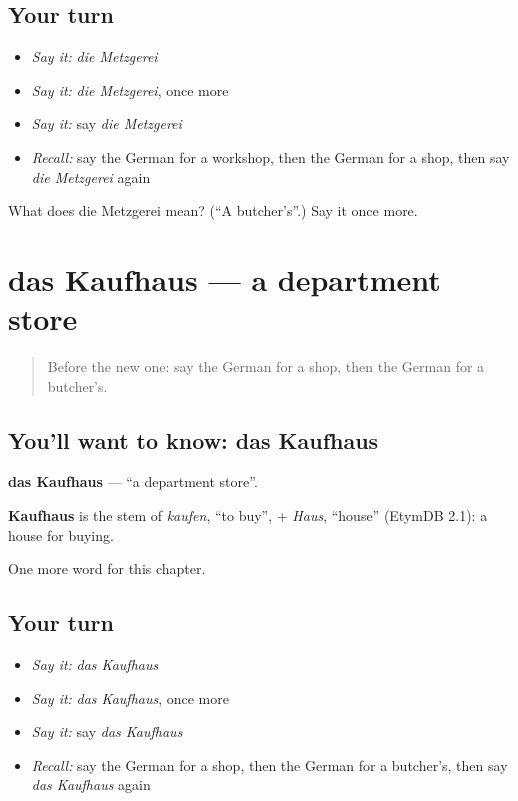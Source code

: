 \subsection*{Your turn}
\begin{itemize}
\raggedright
  \item \emph{Say it:} \emph{die Metzgerei}
  \item \emph{Say it:} \emph{die Metzgerei}, once more
  \item \emph{Say it:} say \emph{die Metzgerei}
  \item \emph{Recall:} say the German for a workshop, then the German for a shop, then say \emph{die Metzgerei} again
\end{itemize}

\begin{tcolorbox}[breakable,colback=teal!4,colframe=teal!35!black,title={Before you move on}]
What does die Metzgerei mean? (\textquotedblleft{}A butcher's\textquotedblright{}.) Say it once more.
\end{tcolorbox}
\section[das Kaufhaus]{das Kaufhaus — a department store}

\label{lesson:GE-C210-kaufhaus}



\begin{quote}
Before the new one: say the German for a shop, then the German for a butcher's.
\end{quote}

\subsection*{You'll want to know: das Kaufhaus}
\textbf{das Kaufhaus} — \textquotedblleft{}a department store\textquotedblright{}.

\begin{cousinweb}
\textbf{Kaufhaus} is the stem of \emph{kaufen}, \textquotedblleft{}to buy\textquotedblright{}, + \emph{Haus}, \textquotedblleft{}house\textquotedblright{} (EtymDB 2.1): a house for buying.
\end{cousinweb}

\begin{grammarlens}[title={What you've built}]
One more word for this chapter.
\end{grammarlens}

\subsection*{Your turn}
\begin{itemize}
\raggedright
  \item \emph{Say it:} \emph{das Kaufhaus}
  \item \emph{Say it:} \emph{das Kaufhaus}, once more
  \item \emph{Say it:} say \emph{das Kaufhaus}
  \item \emph{Recall:} say the German for a shop, then the German for a butcher's, then say \emph{das Kaufhaus} again
\end{itemize}

